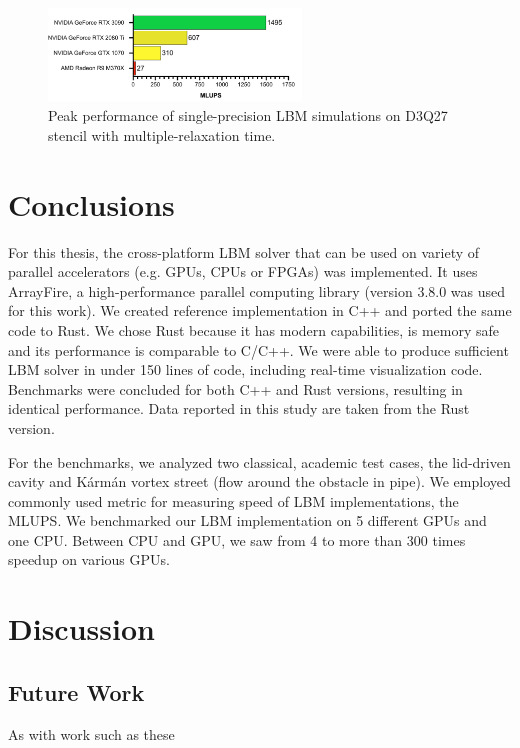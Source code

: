 \begin{figure}[!ht]
	\centering
	\includegraphics[width=0.6\textwidth]{data/max_mlups_3d.pdf}
	\caption{Peak performance of single-precision LBM simulations on D3Q27 stencil with multiple-relaxation time.}
	\label{fig:max_mlups_3d}
\end{figure}

\section{Conclusions}

For this thesis, the cross-platform LBM solver that can be used on variety of parallel accelerators (e.g. GPUs, CPUs or FPGAs) was implemented. It uses ArrayFire, a high-performance parallel computing library (version 3.8.0 was used for this work). We created reference implementation in C++ and ported the same code to Rust. We chose Rust because it has modern capabilities, is memory safe and its performance is comparable to C/C++. We were able to produce sufficient LBM solver in under 150 lines of code, including real-time visualization code. Benchmarks were concluded for both C++ and Rust versions, resulting in identical performance. Data reported in this study are taken from the Rust version. 

For the benchmarks, we analyzed two classical, academic test cases, the lid-driven cavity and Kármán vortex street (flow around the obstacle in pipe). We employed commonly used metric for measuring speed of LBM implementations, the MLUPS. We benchmarked our LBM implementation on 5 different GPUs and one CPU. Between CPU and GPU, we saw from 4 to more than 300 times speedup on various GPUs.

\section{Discussion}

\subsection{Future Work}

As with work such as these

